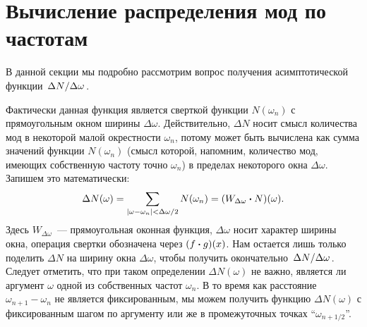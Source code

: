 \documentclass[12pt,a4paper]{article}
\begin{document}

    \appendix


    \section{Вычисление распределения мод по частотам\label{sec:getting_plank_formula}}

        В данной секции мы подробно рассмотрим вопрос получения асимптотической функции $\flatfrac{\Delta N}{\Delta \omega}$.

        Фактически данная функция является сверткой функции $N(\omega_n)$ с прямоугольным окном ширины $\Delta \omega$. Действительно, $\Delta N$ носит смысл количества мод в некоторой малой окрестности $\omega_n$, потому может быть вычислена как сумма значений функции $N(\omega_n)$ (смысл которой, напомним, количество мод, имеющих собственную частоту точно $\omega_n$) в пределах некоторого окна $\Delta \omega$. Запишем это математически:
        \begin{equation}
            \Delta N(\omega) = \sum\limits_{
                \qty|\omega - \omega_n| < \Delta\omega/2
            } N(\omega_n) = \qty(W_{\Delta\omega} \vdot N)(\omega) .
        \end{equation}
        Здесь $W_{\Delta\omega}$~--- прямоугольная оконная функция, $\Delta\omega$ носит характер ширины окна, операция свертки обозначена через $(f \vdot g)(x)$. Нам остается лишь только поделить $\Delta N$ на ширину окна $\Delta\omega$, чтобы получить окончательно $\flatfrac{\Delta N}{\Delta \omega}$. Следует отметить, что при таком определении $\Delta N(\omega)$ не важно, является ли аргумент $\omega$ одной из собственных частот $\omega_n$. В то время как расстояние $\omega_{n+1} - \omega_n$ не является фиксированным, мы можем получить функцию $\Delta N(\omega)$ с фиксированным шагом по аргументу или же в промежуточных точках \enquote{$\omega_{n+1/2}$}.
\end{document}
